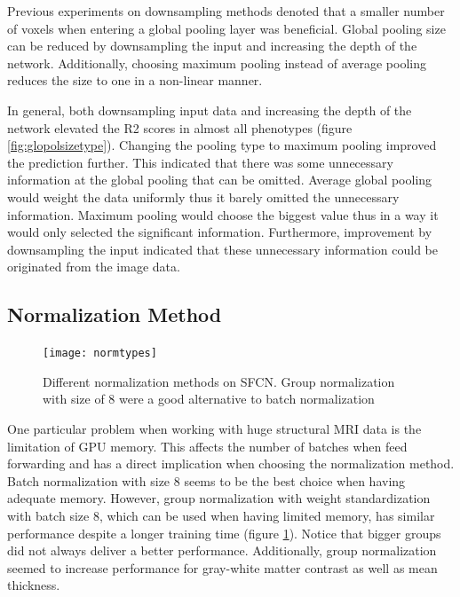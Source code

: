\documentclass{article}
\begin{document}
    Previous experiments on downsampling methods denoted that a smaller number of voxels when entering a global pooling layer was beneficial. 
    Global pooling size can be reduced by downsampling the input and increasing the depth of the network. 
    Additionally, choosing maximum pooling instead of average pooling reduces the size to one in a non-linear manner.

    In general, both downsampling input data and increasing the depth of the network elevated the R2 scores in almost all phenotypes (figure \ref{fig:glopolsizetype}). 
    Changing the pooling type to maximum pooling improved the prediction further. 
    This indicated that there was some unnecessary information at the global pooling that can be omitted.
    Average global pooling would weight the data uniformly thus it barely omitted the unnecessary information. 
    Maximum pooling would choose the biggest value thus in a way it would only selected the significant information. 
    Furthermore, improvement by downsampling the input indicated that these unnecessary information could be originated from the image data.
        
    \subsection*{Normalization Method}
   
    \begin{figure}[h]
        \centering
        \texttt{[image: normtypes]}
        \centering
        \caption{
            Different normalization methods on SFCN. 
            Group normalization with size of 8 were a good alternative to batch normalization}
        \label{fig:normtypes}
    \end{figure}

    One particular problem when working with huge structural MRI data is the limitation of GPU memory. 
    This affects the number of batches when feed forwarding and has a direct implication when choosing the normalization method. 
    Batch normalization with size 8 seems to be the best choice when having adequate memory. 
    However, group normalization with weight standardization with batch size 8, which can be used when having limited memory, has similar performance despite a longer training time (figure \ref{fig:normtypes}). 
    Notice that bigger groups did not always deliver a better performance. 
    Additionally, group normalization seemed to increase performance for gray-white matter contrast as well as mean thickness.
\end{document}
